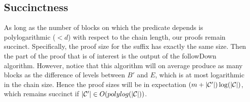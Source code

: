 \subsection{Succinctness}
As long as the number of blocks on which the predicate depends is
polylogarithmic ($< d$) with respect to the chain length, our proofs remain
succinct. Specifically, the proof size for the suffix has exactly the same size.
Then the part of the proof that is of interest is the output of the followDown
algorithm. However, notice that this algorithm will on average produce as many
blocks as the difference of levels between $B'$ and $E$, which is at most
logarithmic in the chain size. Hence the proof sizes will be in expectation $(m +
|\mathcal{C}'|)\log(|\mathcal{C}|)$, which remains succinct if $|\mathcal{C}'| \in
O(polylog(|\mathcal{C}|))$.
